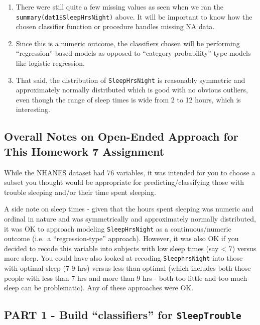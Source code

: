 \documentclass[]{article}
\providecommand{\tightlist}{%
  \setlength{\itemsep}{0pt}\setlength{\parskip}{0pt}}
\begin{document}
\begin{enumerate}
\def\labelenumi{\arabic{enumi}.}
\tightlist
\item
  There were still quite a few missing values as seen when we ran the
  \texttt{summary(dat1\$SleepHrsNight)} above. It will be important to
  know how the chosen classifier function or procedure handles missing
  NA data.
\item
  Since this is a numeric outcome, the classifiers chosen will be
  performing ``regression'' based models as opposed to ``category
  probability'' type models like logistic regression.
\item
  That said, the distribution of \texttt{SleepHrsNight} is reasonably
  symmetric and approximately normally distributed which is good with no
  obvious outliers, even though the range of sleep times is wide from 2
  to 12 hours, which is interesting.
\end{enumerate}

\subsection{\texorpdfstring{Overall Notes on \textbf{Open-Ended
Approach} for This Homework 7
Assignment}{Overall Notes on Open-Ended Approach for This Homework 7 Assignment}}\label{overall-notes-on-open-ended-approach-for-this-homework-7-assignment}

While the NHANES dataset had 76 variables, it was intended for you to
choose a subset you thought would be appropriate for
predicting/classifying those with trouble sleeping and/or their time
spent sleeping.

A side note on sleep times - given that the hours spent sleeping was
numeric and ordinal in nature and was symmetrically and approximately
normally distributed, it was OK to approach modeling
\texttt{SleepHrsNight} as a continuous/numeric outcome (i.e.~a
``regression-type'' approach). However, it was also OK if you decided to
recode this variable into subjects with low sleep times (say \textless{}
7) versus more sleep. You could have also looked at recoding
\texttt{SleephrsNight} into those with optimal sleep (7-9 hrs) versus
less than optimal (which includes both those people with less than 7 hrs
and more than 9 hrs - both too little and too much sleep can be
problematic). Any of these approaches were OK.

\subsection{\texorpdfstring{PART 1 - Build ``classifiers'' for
\texttt{SleepTrouble}}{PART 1 - Build classifiers for SleepTrouble}}\label{part-1---build-classifiers-for-sleeptrouble}
\end{document}
